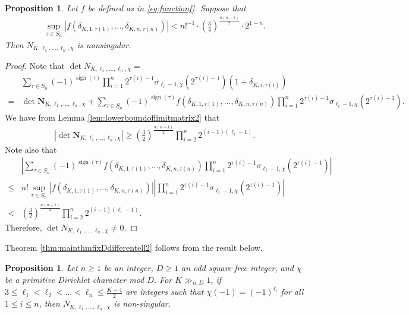 \documentclass[11pt,letterpaper,reqno]{amsart}
\numberwithin{figure}{section}
\numberwithin{table}{section}
\theoremstyle{definition}
\theoremstyle{plain}
\newtheorem{proposition}[theorem]{Proposition}
\theoremstyle{definition}
\theoremstyle{definition}
\theoremstyle{remark}
\numberwithin{equation}{section}
\theoremstyle{remark}
\DeclareMathOperator{\sign}{sign}
\begin{document}
\begin{proposition}
    Let $f$ be defined as in \eqref{eq:functionf}.  Suppose that 
    \begin{align}
        \sup_{\tau\in S_n}|f(\delta_{K,1,\tau(1)},...,\delta_{K,n,\tau(n)})|<n!^{-1}\cdot \left(\frac{3}{4}\right)^{\frac{n(n-1)}{2}}\cdot2^{1-n}.\label{eq:criterion2}
    \end{align}
    Then $N_{K,\ell_1,...,\ell_n,\chi}$ is nonsingular.
\end{proposition}
\begin{proof}
Note that $\det N_{K,\ell_1,...,\ell_n,\chi}=$
    \begin{align*}
        &\sum_{\tau\in S_n}(-1)^{\sign(\tau)}\prod_{i=1}^n2^{\tau(i)-1}\sigma_{\ell_i-1,\chi}(2^{\tau(i)-1})(1+\delta_{K,i,\tau(i)})\\=&\det \mathbf{N}_{K,\ell_1,...,\ell_n,\chi}+\sum_{\tau\in S_n}(-1)^{\sign(\tau)}f(\delta_{K,1,\tau(1)},...,\delta_{K,n,\tau(n)})\prod_{i=1}^n2^{\tau(i)-1}\sigma_{\ell_i-1,\chi}(2^{\tau(i)-1}).
    \end{align*}
  We have from Lemma \ref{lem:lowerboundoflimitmatrix2} that  
\begin{align*}
\left|\det \mathbf{N}_{K,\ell_1,...,\ell_n,\chi}\right|\geq\left(\frac{3}{2}\right)^{\frac{n(n-1)}{2}}\prod_{i=2}^n2^{(i-1)(\ell_i-1)}.
   \end{align*}
 Note  also that
   \begin{align*}
       &\left|\sum_{\tau\in S_n}(-1)^{\sign(\tau)}f(\delta_{K,1,\tau(1)},...,\delta_{K,n,\tau(n)})\prod_{i=1}^n2^{\tau(i)-1}\sigma_{\ell_i-1,\chi}(2^{\tau(i)-1})\right|\\\leq & n! \sup_{\tau\in S_n}|f(\delta_{K,1,\tau(1)},...,\delta_{K,n,\tau(n)})|\left|\prod_{i=1}^n2^{\tau(i)-1}\sigma_{\ell_i-1,\chi}(2^{\tau(i)-1}) \right|\\ <&\left(\frac{3}{2}\right)^{\frac{n(n-1)}{2}}\prod_{i=2}^n2^{(i-1)(\ell_i-1)}.
   \end{align*}
   Therefore,  $\det N_{K,\ell_1,...,\ell_n,\chi}\neq 0$.
\end{proof}
Theorem \ref{thm:mainthmfixDdifferentell2} follows from the result below.
\begin{proposition}\label{prop:typeiinonsingular}
    Let $n\geq1$ be an integer, $D\geq1$ an odd square-free integer, and $\chi$ be a primitive Dirichlet character mod $D$. For $K\gg_{n,D}1$, if $3\leq\ell_1<\ell_2<...<\ell_n\leq\frac{K-4}{2}$ are integers such that $\chi(-1)=(-1)^{\ell_i}$ for all $1\leq i\leq n$, then $N_{K,\ell_1,...,\ell_n,\chi}$ is non-singular.
\end{proposition}
\end{document}
